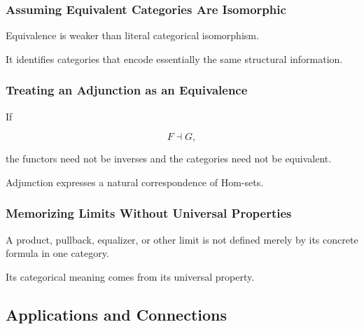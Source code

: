 \subsubsection{Assuming Equivalent Categories Are Isomorphic}

Equivalence is weaker than literal categorical isomorphism.

It identifies categories that encode essentially the same structural
information.

\subsubsection{Treating an Adjunction as an Equivalence}

If

\[ F\dashv G, \]

the functors need not be inverses and the categories need not be equivalent.

Adjunction expresses a natural correspondence of Hom-sets.

\subsubsection{Memorizing Limits Without Universal Properties}

A product, pullback, equalizer, or other limit is not defined merely by its
concrete formula in one category.

Its categorical meaning comes from its universal property.

\subsection{Applications and Connections}
\label{subsec:category-applications}

